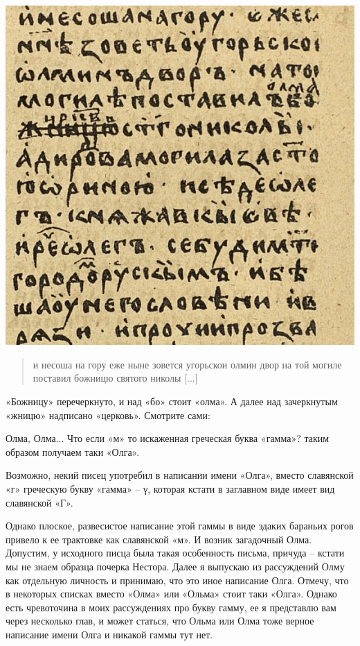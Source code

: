 \begin{center}
\includegraphics[width=\linewidth]{chast-volga/oskoldidir/MTI.png}
\end{center}

\begin{quotation}
и несоша на гору еже ныне зовется угорьскои олмин двор на той могиле поставил божницю святого николы [...]
\end{quotation}

«Божницу» перечеркнуто, и над «бо» стоит «олма». А далее над зачеркнутым «жницю» надписано «церковь». Смотрите сами:

Олма, Олма... Что если «м» то искаженная греческая буква «гамма»? таким образом получаем таки «Олга».

Возможно, некий писец употребил в написании имени «Олга», вместо славянской «г» греческую букву «гамма» – γ, которая кстати в заглавном виде имеет вид славянской «Г». 

Однако плоское, развесистое написание этой гаммы в виде эдаких бараньих рогов привело к ее трактовке как славянской «м». И возник загадочный Олма. Допустим, у исходного писца была такая особенность письма, причуда – кстати мы не знаем образца почерка Нестора. Далее я выпускаю из рассуждений Олму как отдельную личность и принимаю, что это иное написание Олга. Отмечу, что в некоторых списках вместо «Олма» или «Ольма» стоит таки «Олга». Однако есть чревоточина в моих рассуждениях про букву гамму, ее я представлю вам через несколько глав, и может статься, что Ольма или Олма тоже верное написание имени Олга и никакой гаммы тут нет.

